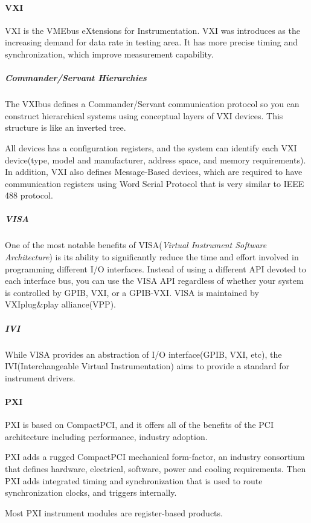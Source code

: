 \paragraph{VXI} VXI is the VMEbus eXtensions for Instrumentation. VXI was introduces as the increasing demand for data rate in testing area. It has more precise timing and synchronization, which improve measurement capability.

\subparagraph{Commander/Servant Hierarchies} The VXIbus defines a Commander/Servant communication protocol so you can construct hierarchical systems using conceptual layers of VXI devices. This structure is like an inverted tree.

All devices has a configuration registers, and the system can identify each VXI device(type, model and manufacturer, address space, and memory requirements). In addition, VXI also defines Message-Based devices, which are required to have communication registers using Word Serial Protocol that is very similar to IEEE 488 protocol.

\subparagraph{VISA} One of the most notable benefits of VISA(\emph{Virtual Instrument Software Architecture}) is its ability to significantly reduce the time and effort involved in programming different I/O interfaces. Instead of using a different API devoted to each interface bus, you can use the VISA API regardless of whether your system is controlled by GPIB, VXI, or a GPIB-VXI. VISA is maintained by VXIplug\&play alliance(VPP).

\subparagraph{IVI} While VISA provides an abstraction of I/O interface(GPIB, VXI, etc), the IVI(Interchangeable Virtual Instrumentation) aims to provide a standard for instrument drivers.

\paragraph{PXI} PXI is based on CompactPCI, and it offers all of the benefits of the PCI architecture including performance, industry adoption.

PXI adds a rugged CompactPCI mechanical form-factor, an industry consortium that defines hardware, electrical, software, power and cooling requirements. Then PXI adds integrated timing and synchronization that is used to route synchronization clocks, and triggers internally.

Most PXI instrument modules are register-based products.

